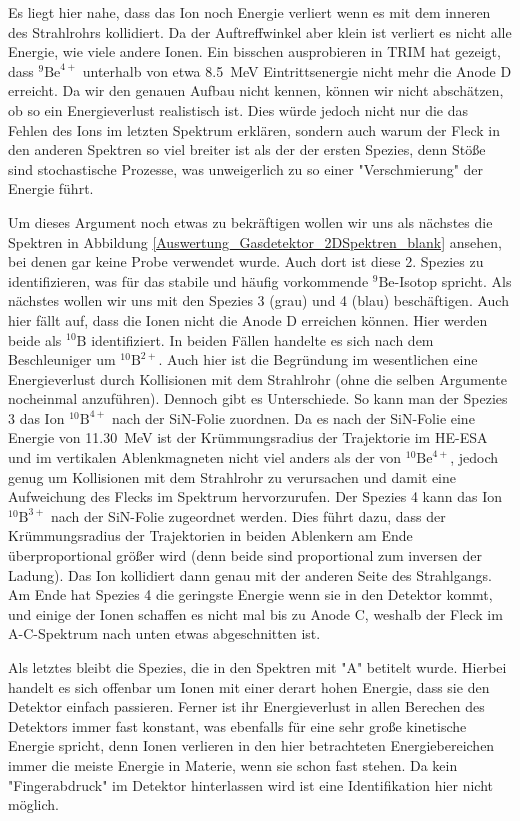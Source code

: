 Es liegt hier nahe, dass das Ion noch Energie verliert wenn es mit dem inneren des Strahlrohrs kollidiert.
Da der Auftreffwinkel aber klein ist verliert es nicht alle Energie, wie viele andere Ionen.
Ein bisschen ausprobieren in TRIM hat gezeigt, dass $^{9}\text{Be}^{4+}$ unterhalb von etwa \SI{8.5}{\mega\electronvolt} Eintrittsenergie nicht mehr die Anode D erreicht.
Da wir den genauen Aufbau nicht kennen, können wir nicht abschätzen, ob so ein Energieverlust realistisch ist.
Dies würde jedoch nicht nur die das Fehlen des Ions im letzten Spektrum erklären, sondern auch warum der Fleck in den anderen Spektren so viel breiter ist als der der ersten Spezies, denn Stöße sind stochastische Prozesse, was unweigerlich zu so einer "Verschmierung" der Energie führt.

Um dieses Argument noch etwas zu bekräftigen wollen wir uns als nächstes die Spektren in Abbildung \ref{Auswertung_Gasdetektor_2DSpektren_blank} ansehen, bei denen gar keine Probe verwendet wurde.
Auch dort ist diese 2. Spezies zu identifizieren, was für das stabile und häufig vorkommende $^{9}\text{Be}$-Isotop spricht.
Als nächstes wollen wir uns mit den Spezies 3 (grau) und 4 (blau) beschäftigen.
Auch hier fällt auf, dass die Ionen nicht die Anode D erreichen können.
Hier werden beide als $^{10}\text{B}$ identifiziert.
In beiden Fällen handelte es sich nach dem Beschleuniger um $^{10}\text{B}^{2+}$.
Auch hier ist die Begründung im wesentlichen eine Energieverlust durch Kollisionen mit dem Strahlrohr (ohne die selben Argumente nocheinmal anzuführen).
Dennoch gibt es Unterschiede.
So kann man der Spezies 3 das Ion $^{10}\text{B}^{4+}$ nach der SiN-Folie zuordnen.
Da es nach der SiN-Folie eine Energie von \SI{11.30}{\mega\electronvolt} ist der Krümmungsradius der Trajektorie im HE-ESA und im vertikalen Ablenkmagneten nicht viel anders als der von $^{10}\text{Be}^{4+}$, jedoch genug um Kollisionen mit dem Strahlrohr zu verursachen und damit eine Aufweichung des Flecks im Spektrum hervorzurufen.
Der Spezies 4 kann das Ion $^{10}\text{B}^{3+}$ nach der SiN-Folie zugeordnet werden.
Dies führt dazu, dass der Krümmungsradius der Trajektorien in beiden Ablenkern am Ende überproportional größer wird (denn beide sind proportional zum inversen der Ladung).
Das Ion kollidiert dann genau mit der anderen Seite des Strahlgangs.
Am Ende hat Spezies 4 die geringste Energie wenn sie in den Detektor kommt, und einige der Ionen schaffen es nicht mal bis zu Anode C, weshalb der Fleck im A-C-Spektrum nach unten etwas abgeschnitten ist.

Als letztes bleibt die Spezies, die in den Spektren mit "A" betitelt wurde.
Hierbei handelt es sich offenbar um Ionen mit einer derart hohen Energie, dass sie den Detektor einfach passieren.
Ferner ist ihr Energieverlust in allen Berechen des Detektors immer fast konstant, was ebenfalls für eine sehr große kinetische Energie spricht, denn Ionen verlieren in den hier betrachteten Energiebereichen immer die meiste Energie in Materie, wenn sie schon fast stehen.
Da kein "Fingerabdruck" im Detektor hinterlassen wird ist eine Identifikation hier nicht möglich.

